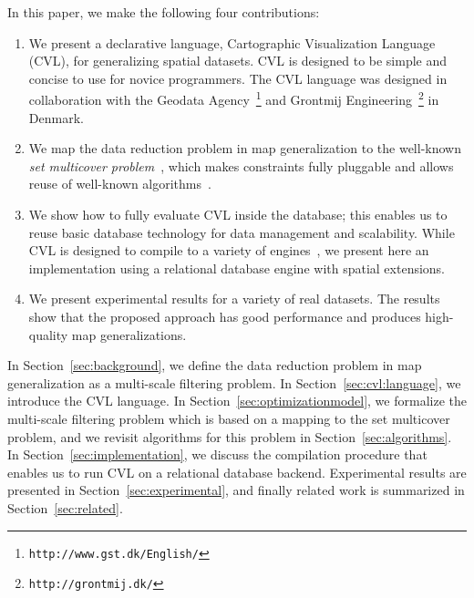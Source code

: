 In this paper, we make the following four contributions:
\begin{enumerate}
\item We present a declarative language, Cartographic Visualization Language (CVL), for generalizing spatial datasets. CVL is designed to be simple and concise to use for novice programmers. The CVL language was designed in collaboration with the Geodata Agency~\footnote{\texttt{http://www.gst.dk/English/}} and Grontmij Engineering~\footnote{\texttt{http://grontmij.dk/}} in Denmark.

\item We map the data reduction problem in map generalization to the well-known \emph{set multicover problem}~\cite{rajagopalan1998primal}, which makes constraints fully pluggable and allows reuse of well-known algorithms~\cite{rajagopalan1998primal,vazirani2001approximation}.

\item We show how to fully evaluate CVL inside the database; this enables us to reuse basic database technology for data management and scalability. While CVL is designed to compile to a variety of engines~\cite{Stonebraker:2010:PDBMSvsMapReduce}, we present here an implementation using a relational database engine with spatial extensions.

\item We present experimental results for a variety of real datasets. The results show that the proposed approach has good performance and produces high-quality map generalizations.
\end{enumerate}

In Section~\ref{sec:background}, we define the data reduction problem in map generalization as a multi-scale filtering problem. In Section~\ref{sec:cvl:language}, we introduce the CVL language. In Section~\ref{sec:optimizationmodel}, we formalize the multi-scale filtering problem which is based on a mapping to the set multicover problem, and we revisit algorithms for this problem in Section~\ref{sec:algorithms}. In Section~\ref{sec:implementation}, we discuss the compilation procedure that enables us to run CVL on a relational database backend. Experimental results are presented in Section~\ref{sec:experimental}, and finally related work is summarized in Section~\ref{sec:related}.
